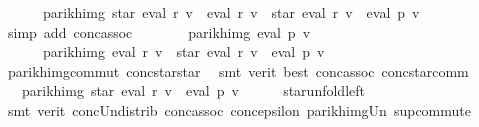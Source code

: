 \begin{isabellebody}
\ \ \ \ \ \ parikh{\isacharunderscore}{\kern0pt}img\ {\isacharparenleft}{\kern0pt}star\ {\isacharparenleft}{\kern0pt}eval\ {\isacharquery}{\kern0pt}r\ v{\isacharparenright}{\kern0pt}\ {\isacharat}{\kern0pt}{\isacharat}{\kern0pt}\ eval\ {\isacharquery}{\kern0pt}r\ v\ {\isacharat}{\kern0pt}{\isacharat}{\kern0pt}\ star\ {\isacharparenleft}{\kern0pt}eval\ {\isacharquery}{\kern0pt}r\ v{\isacharparenright}{\kern0pt}\ {\isacharat}{\kern0pt}{\isacharat}{\kern0pt}\ eval\ p\ v{\isacharparenright}{\kern0pt}{\isachardoublequoteclose}\isanewline
\ \ \ \ \isamarkupfalse%
\ {\isacharparenleft}{\kern0pt}simp\ add{\isacharcolon}{\kern0pt}\ conc{\isacharunderscore}{\kern0pt}assoc{\isacharparenright}{\kern0pt}\isanewline
\ \ \isamarkupfalse%
\ \isamarkupfalse%
\ {\isachardoublequoteopen}{\isasymdots}\ {\isacharequal}{\kern0pt}\ parikh{\isacharunderscore}{\kern0pt}img\ {\isacharparenleft}{\kern0pt}eval\ p\ v{\isacharparenright}{\kern0pt}\ {\isasymunion}\isanewline
\ \ \ \ \ \ parikh{\isacharunderscore}{\kern0pt}img\ {\isacharparenleft}{\kern0pt}eval\ {\isacharquery}{\kern0pt}r\ v\ {\isacharat}{\kern0pt}{\isacharat}{\kern0pt}\ star\ {\isacharparenleft}{\kern0pt}eval\ {\isacharquery}{\kern0pt}r\ v{\isacharparenright}{\kern0pt}\ {\isacharat}{\kern0pt}{\isacharat}{\kern0pt}\ eval\ p\ v{\isacharparenright}{\kern0pt}{\isachardoublequoteclose}\isanewline
\ \ \ \ \isamarkupfalse%
\ parikh{\isacharunderscore}{\kern0pt}img{\isacharunderscore}{\kern0pt}commut\ conc{\isacharunderscore}{\kern0pt}star{\isacharunderscore}{\kern0pt}star\ \isamarkupfalse%
\ {\isacharparenleft}{\kern0pt}smt\ {\isacharparenleft}{\kern0pt}verit{\isacharcomma}{\kern0pt}\ best{\isacharparenright}{\kern0pt}\ conc{\isacharunderscore}{\kern0pt}assoc\ conc{\isacharunderscore}{\kern0pt}star{\isacharunderscore}{\kern0pt}comm{\isacharparenright}{\kern0pt}\isanewline
\ \ \isamarkupfalse%
\ \isamarkupfalse%
\ {\isachardoublequoteopen}{\isasymdots}\ {\isacharequal}{\kern0pt}\ parikh{\isacharunderscore}{\kern0pt}img\ {\isacharparenleft}{\kern0pt}star\ {\isacharparenleft}{\kern0pt}eval\ {\isacharquery}{\kern0pt}r\ v{\isacharparenright}{\kern0pt}\ {\isacharat}{\kern0pt}{\isacharat}{\kern0pt}\ eval\ p\ v{\isacharparenright}{\kern0pt}{\isachardoublequoteclose}\isanewline
\ \ \ \ \isamarkupfalse%
\ star{\isacharunderscore}{\kern0pt}unfold{\isacharunderscore}{\kern0pt}left\isanewline
\ \ \ \ \isamarkupfalse%
\ {\isacharparenleft}{\kern0pt}smt\ {\isacharparenleft}{\kern0pt}verit{\isacharparenright}{\kern0pt}\ conc{\isacharunderscore}{\kern0pt}Un{\isacharunderscore}{\kern0pt}distrib{\isacharparenleft}{\kern0pt}{}{\isacharparenright}{\kern0pt}\ conc{\isacharunderscore}{\kern0pt}assoc\ conc{\isacharunderscore}{\kern0pt}epsilon{\isacharparenleft}{\kern0pt}{}{\isacharparenright}{\kern0pt}\ parikh{\isacharunderscore}{\kern0pt}img{\isacharunderscore}{\kern0pt}Un\ sup{\isacharunderscore}{\kern0pt}commute{\isacharparenright}{\kern0pt}\isanewline

\end{isabellebody}

